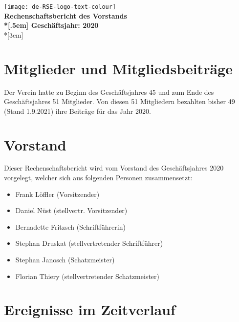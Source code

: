\newcommand{\jahr}{2020}



\thispagestyle{empty}

\begin{centering}
\texttt{[image: de-RSE-logo-text-colour]}\\
\vspace{3em}
\textbf{
 \Large Rechenschaftsbericht des Vorstands\\*[.5em]
 \normalsize Geschäftsjahr: \jahr}\\*[3em]
\end{centering}

\section{Mitglieder und Mitgliedsbeiträge}

Der Verein hatte zu Beginn des Geschäftsjahres 45 und zum Ende des Geschäftsjahres 51 Mitglieder. Von diesen 51 Mitgliedern bezahlten bisher 49 (Stand  1.9.2021) ihre Beiträge für das Jahr 2020.

\section{Vorstand}

Dieser Rechenschaftsbericht wird vom Vorstand des Geschäftsjahres 2020 vorgelegt, welcher sich aus folgenden Personen zusammensetzt:

\begin{itemize}
  \setlength{\itemsep}{0pt plus 1pt}
  \item Frank Löffler (Vorsitzender)
  \item Daniel Nüst (stellvertr. Vorsitzender)
  \item Bernadette Fritzsch (Schriftführerin)
  \item Stephan Druskat (stellvertretender Schriftführer)
  \item Stephan Janosch (Schatzmeister)
  \item Florian Thiery (stellvertretender Schatzmeister)
\end{itemize}

\section{Ereignisse im Zeitverlauf}

